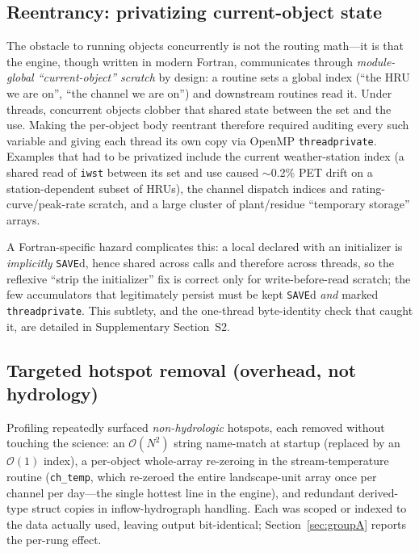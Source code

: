 \subsection{Reentrancy: privatizing current-object state}\label{sec:reentrancy}
The obstacle to running objects concurrently is not the routing math---it is that the engine,
though written in modern Fortran, communicates through \emph{module-global ``current-object''
scratch} by design: a routine sets a
global index (``the HRU we are on'', ``the channel we are on'') and downstream routines read
it. Under threads, concurrent objects clobber that shared state between the set and the use.
Making the per-object body reentrant therefore required auditing every such variable and
giving each thread its own copy via OpenMP \texttt{threadprivate}. Examples that had to be
privatized include the current weather-station index (a shared read of \texttt{iwst} between
its set and use caused $\sim$0.2\% PET drift on a station-dependent subset of HRUs), the
channel dispatch indices and rating-curve/peak-rate scratch, and a large cluster of
plant/residue ``temporary storage'' arrays.

A Fortran-specific hazard complicates this: a local declared with an initializer is
\emph{implicitly} \texttt{SAVE}d, hence shared across calls and therefore across threads, so the
reflexive ``strip the initializer'' fix is correct only for write-before-read scratch; the few
accumulators that legitimately persist must be kept \texttt{SAVE}d \emph{and} marked
\texttt{threadprivate}. This subtlety, and the one-thread byte-identity check that caught it, are
detailed in Supplementary Section~S2.

\subsection{Targeted hotspot removal (overhead, not hydrology)}\label{sec:hotspots}
Profiling repeatedly surfaced \emph{non-hydrologic} hotspots, each removed without touching the
science: an $\mathcal{O}(N^2)$ string name-match at startup (replaced by an $\mathcal{O}(1)$ index),
a per-object whole-array re-zeroing in the stream-temperature routine (\texttt{ch\_temp}, which
re-zeroed the entire landscape-unit array once per channel per day---the single hottest line in the
engine), and redundant derived-type struct copies in inflow-hydrograph handling. Each was scoped or
indexed to the data actually used, leaving output bit-identical; Section~\ref{sec:groupA} reports
the per-rung effect.

